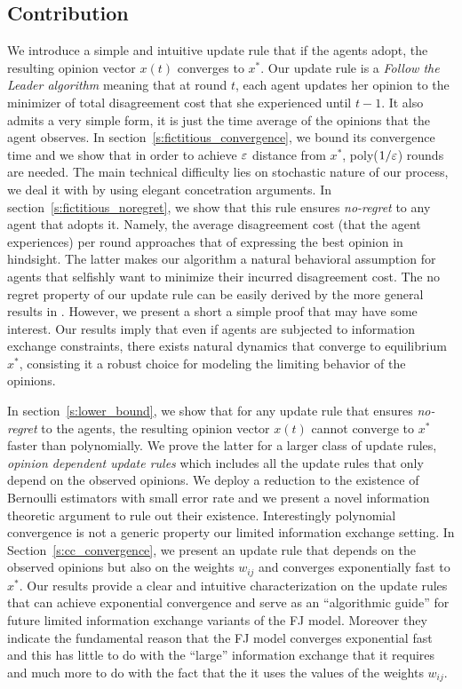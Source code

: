 \subsection{Contribution}
We introduce a simple and intuitive update rule that if the agents adopt,
the resulting opinion vector $x(t)$ converges to $x^*$.
Our update rule is a \emph{Follow the Leader algorithm}
meaning that at round $t$, each agent updates her opinion
to the minimizer of total disagreement cost that
she experienced until $t-1$. It also admits a very simple form,
it is just the time average of the opinions that the agent observes.
In section~\ref{s:fictitious_convergence},
we bound its convergence time and we show that in order
to achieve $\varepsilon$ distance from $x^*$, poly($1/\varepsilon$) rounds
are needed. The main technical difficulty lies on stochastic nature
of our process, we deal it with by using elegant concetration arguments.
In section~\ref{s:fictitious_noregret},
we show that this rule ensures \emph{no-regret} to any agent
that adopts it. Namely, the average disagreement cost (that
the agent experiences) per round approaches that
of expressing the best opinion in hindsight. The latter
makes our algorithm a natural behavioral assumption for
agents that selfishly want to minimize their incurred disagreement cost.
The no regret property of our update rule can be easily derived by the
more general results in \cite{HAK07}. However, we present a short a simple
proof that may have some interest. Our results imply that even
if agents are subjected to information exchange constraints, there exists natural
dynamics that converge to equilibrium $x^*$, consisting it
a robust choice for modeling the limiting behavior of the opinions.

In section~\ref{s:lower_bound}, we show
that for any update rule that ensures \emph{no-regret}
to the agents, the resulting opinion vector $x(t)$
cannot converge to $x^*$ faster than polynomially.
We prove the latter for a larger class of update rules,
\emph{opinion dependent update rules} which includes
all the update rules that only depend on the observed
opinions. We deploy a reduction to the existence of
Bernoulli estimators with small error rate and we present
a novel information theoretic argument to rule out their
existence. Interestingly polynomial convergence is not a
generic property our limited information exchange setting.
In Section~\ref{s:cc_convergence}, we present an update rule
that depends on the observed opinions but also on the weights
$w_{ij}$ and converges exponentially fast to $x^*$. Our results
provide a clear and intuitive characterization on the update
rules that can achieve exponential convergence and serve as
an \enquote{algorithmic guide} for future limited information exchange
variants of the FJ model. Moreover they indicate the fundamental reason that
the FJ model converges exponential fast and this has little
to do with the \enquote{large} information exchange
that it requires and much more to do with the fact that
the it uses the values of the weights $w_{ij}$.

